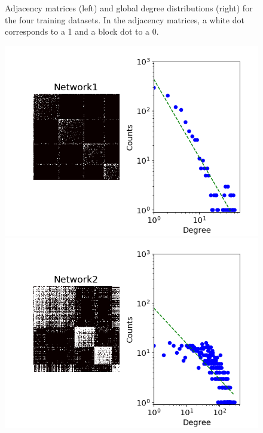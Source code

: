 \documentclass[french]{hermes-journal}
\begin{document}
\begin{figure}[h] {Adjacency matrices (left) and global degree distributions (right) for the four training datasets. In the adjacency matrices, a white dot corresponds to a 1 and a block dot to a 0.}
        \begin{minipage}{0.4\textwidth}
            \includegraphics[width=1.1\textwidth]{img/corpus/network1_dd}
        \end{minipage}
        \begin{minipage}{0.4\textwidth}
            \includegraphics[width=1.1\textwidth]{img/corpus/network2_dd}
        \end{minipage}
        \begin{minipage}{0.4\textwidth}

\end{minipage}
\end{figure}
\end{document}
